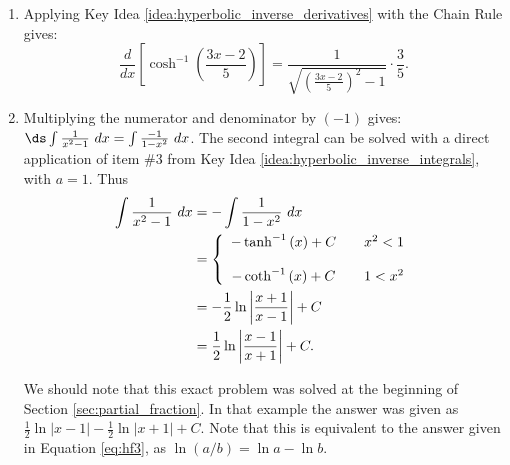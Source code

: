 {\begin{enumerate}
\item		Applying Key Idea \ref{idea:hyperbolic_inverse_derivatives} with the Chain Rule gives:
		$$\frac{d}{dx}\left[\cosh^{-1}\left(\frac{3x-2}5\right)\right] = \frac{1}{\sqrt{\left(\frac{3x-2}5\right)^2-1}}\cdot\frac35.$$

\item		Multiplying the numerator and denominator by $(-1)$ gives: $\ds \int \frac{1}{x^2-1}\ dx = \int \frac{-1}{1-x^2}\ dx$. The second integral can be solved with a direct application of item \#3 from Key Idea \ref{idea:hyperbolic_inverse_integrals}, with $a=1$. Thus
\begin{align}
\int \frac{1}{x^2-1}\ dx &= -\int \frac{1}{1-x^2}\ dx \notag \\
		&= \left\{\begin{array}{ccc} -\tanh^{-1}\left(x\right)+C & & x^2<1 \\ \\
-\coth^{-1}\left(x\right)+C & & 1<x^2 \end{array}\right. \notag\\
     &=-\frac12\ln\left|\frac{x+1}{x-1}\right|+C\notag\\
     &=\frac12\ln\left|\frac{x-1}{x+1}\right|+C.\label{eq:hf3}
     \end{align}

We should note that this exact problem was solved at the beginning of Section \ref{sec:partial_fraction}. In that example the answer was given as $\frac12\ln|x-1|-\frac12\ln|x+1|+C.$ Note that this is equivalent to the answer given in Equation \ref{eq:hf3}, as $\ln(a/b) = \ln a - \ln b$.

%


\end{enumerate}}
